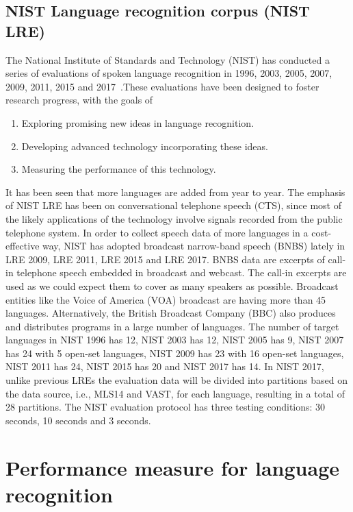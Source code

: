 \begin{spacing}{1.5}
\subsection{NIST Language recognition corpus (NIST LRE)}
The National Institute of Standards and Technology (NIST) has conducted a series of evaluations of spoken language recognition in 1996, 2003, 2005, 2007, 2009, 2011, 2015 and 2017~\cite{martin2003nist,martin2009,greenberg20122011}.These  evaluations  have  been designed  to  foster  research progress, with the goals of
\begin{enumerate}
    \item Exploring promising new ideas in language recognition.
    \item Developing advanced technology incorporating these ideas.
    \item Measuring the performance of this technology.
\end{enumerate}
It has been seen that more languages are added from year to year. The emphasis of NIST LRE has been on conversational telephone speech (CTS), since most of the likely applications of the technology involve signals recorded from the public telephone system. In order to collect speech data of more languages in a cost-effective way, NIST has adopted broadcast narrow-band speech (BNBS) lately in LRE 2009, LRE 2011, LRE 2015 and LRE 2017. BNBS data are excerpts of call-in telephone speech embedded in broadcast and webcast. The call-in excerpts are used as we could expect them to cover as many speakers as possible. Broadcast entities like the Voice of America (VOA) broadcast are having more than 45 languages. Alternatively, the British Broadcast Company (BBC) also produces and distributes programs in a large number of languages. The number of target languages in NIST 1996 has 12, NIST 2003 has 12, NIST 2005 has 9, NIST 2007 has 24 with 5 open-set languages, NIST 2009 has 23 with 16 open-set languages, NIST 2011 has 24, NIST 2015 has 20 and NIST 2017 has 14. In NIST 2017, unlike previous  LREs the evaluation data will be divided into partitions based on the data source, i.e., MLS14 and VAST, for each language, resulting in a total of 28 partitions. The NIST evaluation protocol has three testing conditions:
30 seconds, 10 seconds and 3 seconds.

\section{Performance measure for language recognition}


\end{spacing}
